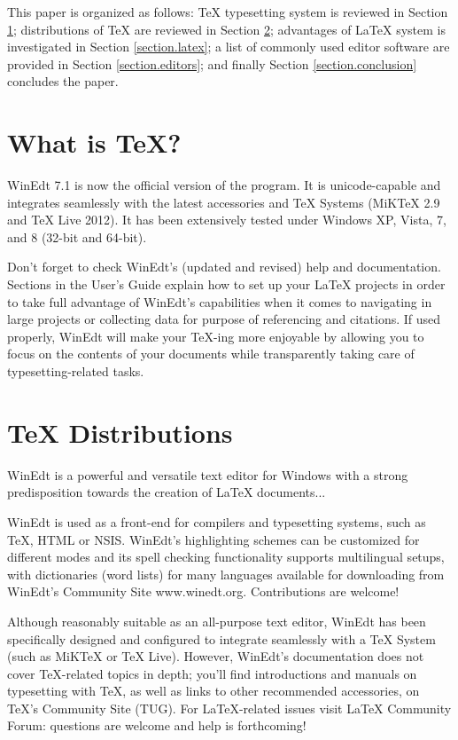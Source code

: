 \documentclass[11pt,a4paper]{article}
\newcommand{\myhyperref}[2]{#2 \ref{#1}}
\begin{document}
This paper is organized as follows: \TeX{} typesetting system is reviewed in \myhyperref{section.tex}{Section}; distributions of \TeX{} are reviewed in \myhyperref{section.dist}{Section}; advantages of \LaTeX{} system is investigated in \myhyperref{section.latex}{Section}; a list of commonly used editor software are provided in \myhyperref{section.editors}{Section}; and finally \myhyperref{section.conclusion}{Section} concludes the paper.

\section{What is \TeX{}?} \label{section.tex}

WinEdt 7.1 is now the official version of the program. It is unicode-capable and integrates seamlessly with the latest accessories and TeX Systems (MiKTeX 2.9 and TeX Live 2012). It has been extensively tested under Windows XP, Vista, 7, and 8 (32-bit and 64-bit).

Don't forget to check WinEdt's (updated and revised) help and documentation. Sections in the User's Guide explain how to set up your LaTeX projects in order to take full advantage of WinEdt's capabilities when it comes to navigating in large projects or collecting data for purpose of referencing and citations. If used properly, WinEdt will make your TeX-ing more enjoyable by allowing you to focus on the contents of your documents while transparently taking care of typesetting-related tasks.

\section{\TeX{} Distributions} \label{section.dist}

WinEdt is a powerful and versatile text editor for Windows with a strong predisposition towards the creation of LaTeX documents...

WinEdt is used as a front-end for compilers and typesetting systems, such as TeX, HTML or NSIS. WinEdt's highlighting schemes can be customized for different modes and its spell checking functionality supports multilingual setups, with dictionaries (word lists) for many languages available for downloading from WinEdt's Community Site www.winedt.org. Contributions are welcome!

Although reasonably suitable as an all-purpose text editor, WinEdt has been specifically designed and configured to integrate seamlessly with a TeX System (such as MiKTeX or TeX Live). However, WinEdt's documentation does not cover TeX-related topics in depth; you'll find introductions and manuals on typesetting with TeX, as well as links to other recommended accessories, on TeX's Community Site (TUG). For LaTeX-related issues visit LaTeX Community Forum: questions are welcome and help is forthcoming!
\end{document}
